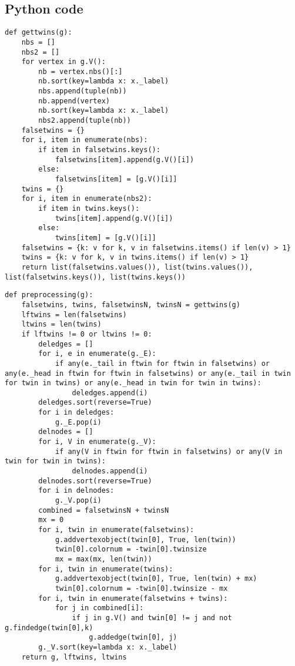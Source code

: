 \documentclass[twoside]{article}
\theoremstyle{definition}
\theoremstyle{plain}
\begin{document}
\begin{appendices}

\section{Python code}
\lstset{language=Python}
\begin{lstlisting}[label={gettwins}]
def gettwins(g):
	nbs = []
	nbs2 = []
	for vertex in g.V():
		nb = vertex.nbs()[:]
		nb.sort(key=lambda x: x._label)
		nbs.append(tuple(nb))
		nb.append(vertex)
		nb.sort(key=lambda x: x._label)
		nbs2.append(tuple(nb))
	falsetwins = {}
	for i, item in enumerate(nbs):
		if item in falsetwins.keys():
			falsetwins[item].append(g.V()[i])
		else:
			falsetwins[item] = [g.V()[i]]
	twins = {}
	for i, item in enumerate(nbs2):
		if item in twins.keys():
			twins[item].append(g.V()[i])
		else:
			twins[item] = [g.V()[i]]
	falsetwins = {k: v for k, v in falsetwins.items() if len(v) > 1}
	twins = {k: v for k, v in twins.items() if len(v) > 1}
	return list(falsetwins.values()), list(twins.values()), list(falsetwins.keys()), list(twins.keys())   
\end{lstlisting}


\begin{lstlisting}[label={preprocessing}]
def preprocessing(g):
	falsetwins, twins, falsetwinsN, twinsN = gettwins(g)
	lftwins = len(falsetwins)
	ltwins = len(twins)
	if lftwins != 0 or ltwins != 0:
		deledges = []
		for i, e in enumerate(g._E):
			if any(e._tail in ftwin for ftwin in falsetwins) or any(e._head in ftwin for ftwin in falsetwins) or any(e._tail in twin for twin in twins) or any(e._head in twin for twin in twins):
				deledges.append(i)
		deledges.sort(reverse=True)
		for i in deledges:
			g._E.pop(i)
		delnodes = []
		for i, V in enumerate(g._V):
			if any(V in ftwin for ftwin in falsetwins) or any(V in twin for twin in twins):
				delnodes.append(i)
		delnodes.sort(reverse=True)
		for i in delnodes:
			g._V.pop(i)
		combined = falsetwinsN + twinsN
		mx = 0
		for i, twin in enumerate(falsetwins):
			g.addvertexobject(twin[0], True, len(twin))
			twin[0].colornum = -twin[0].twinsize
			mx = max(mx, len(twin))
		for i, twin in enumerate(twins):
			g.addvertexobject(twin[0], True, len(twin) + mx)
			twin[0].colornum = -twin[0].twinsize - mx
		for i, twin in enumerate(falsetwins + twins):
			for j in combined[i]:
				if j in g.V() and twin[0] != j and not g.findedge(twin[0],k)
					g.addedge(twin[0], j)
		g._V.sort(key=lambda x: x._label)
	return g, lftwins, ltwins
\end{lstlisting}


\end{appendices}
\end{document}

